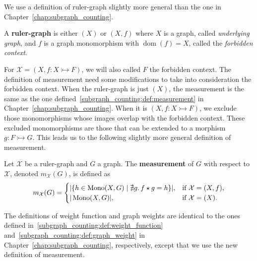 
We use a definition of ruler-graph slightly more general than the one in Chapter~\ref{chap:subgraph_counting}.

\begin{definition}
    \label{antipattern:def:ruler_graph}
    A \textbf{ruler-graph} is either $(X)$ or \( (X, f) \) where $X$ is a graph, called \emph{underlying graph}, and $f$ is a graph monomorphism with $\operatorname{dom}(f) = X$, called the \emph{forbidden context}.
\end{definition}
For $\mathcal{X} = (X, f:X \rightarrowtail F)$, we will also called $F$ the forbidden context. The definition of measurement need some modifications to take into consideration the forbidden context. When the ruler-graph is just $(X)$, the measurement is the same as the one defined~\autoref{subgraph_counting:def:measurement} in Chapter~\ref{chap:subgraph_counting}. When it is $(X, f:X \rightarrowtail F)$, we exclude those monomorphisms whose images overlap with the forbidden context. These excluded monomorphisms are those that can be extended to a morphism $g: F \rightarrowtail G$. This leads us to the following slightly more general definition of measurement.
\begin{definition} 
    \label{antipattern:def:measurement}
    Let \( \mathcal{X}\) be a ruler-graph and \( G \) a graph. The \textbf{measurement} of \( G \) with respect to \( \mathcal{X}\), denoted \( m_\mathcal{X}(G) \), is defined as 
    \[
        m_\mathcal{X}(G) =
        \begin{cases}
            |\{h \in \operatorname{Mono}(X,G) \mid \nexists g.\,f \star g = h \}|, & \text{if } \mathcal{X} = (X, f), \\
            |\operatorname{Mono}(X,G)|, & \text{if } \mathcal{X} = (X).
        \end{cases}
    \]
\end{definition}
The definitions of weight function and graph weights are identical to the ones defined in~\autoref{subgraph_counting:def:weight_function} and~\autoref{subgraph_counting:def:graph_weight} in Chapter~\ref{chap:subgraph_counting}, respectively, except that we use the new definition of measurement.